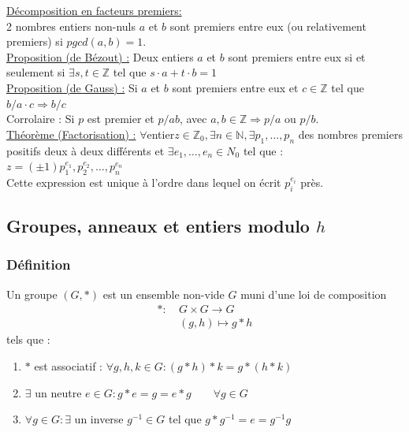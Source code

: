 \documentclass[11pt]{article}
\begin{document}
			\underline{Décomposition en facteurs premiers:}\\
			2 nombres entiers non-nuls $a$ et $b$ sont premiers entre eux (ou relativement premiers) si $pgcd(a, b) = 1$.\\

			\underline{Proposition (de Bézout) :} Deux entiers $a$ et $b$ sont premiers entre eux si et seulement si $\exists s, t \in \mathbb Z$ tel que $s \cdot a + t \cdot b = 1$\\

			\underline{Proposition (de Gauss) :} Si $a$ et $b$ sont premiers entre eux et $c \in \mathbb Z$ tel que $b / a \cdot c \Rightarrow b / c$\\
			Corrolaire : Si $p$ est premier et $p /ab$, avec $a,b \in \mathbb Z \Rightarrow p/a$ ou $p/b$.\\

			\underline{Théorème (Factorisation) :} $\forall $entier$ z \in \mathbb Z_0, \exists n \in \mathbb N, \exists p_1, …, p_n$ des nombres premiers positifs deux à deux différents et $\exists e_1, …, e_n \in N_0$ tel que :\\
			$z = (\pm 1) p_1^{e_1}, p_2^{e_2}, …, p_n^{e_n}$\\
			Cette expression est unique à l'ordre dans lequel on écrit $p_i^{e_i}$ près.
			
  
	\subsection{Groupes, anneaux et entiers modulo $h$}
		\subsubsection{Définition}
			Un groupe $(G,*)$ est un ensemble non-vide $G$ muni d'une loi de composition 
			\begin{align*}
				* :&\ G \times G \rightarrow G\\
				&\ (g,h) \mapsto g * h
			\end{align*}
			tels que :
			\begin{enumerate}
				\item $*$ est associatif : $\forall g,h,k \in G : (g * h) * k = g * (h * k)$
				\item $\exists$ un neutre $e \in G : g * e = g = e * g \qquad \forall g \in G$
				\item $\forall g \in G : \exists$ un inverse $g^{-1} \in G$ tel que $g * g^{-1} = e = g^{-1}  g$
			\end{enumerate}
\end{document}
